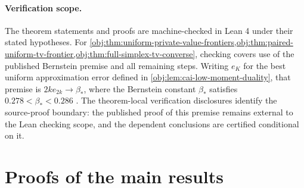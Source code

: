 \documentclass[11pt]{article}
\begin{document}
\paragraph{Verification scope.}
The theorem statements and proofs are machine-checked in Lean 4 under their stated hypotheses. For \cref{obj:thm:uniform-private-value-frontiers,obj:thm:paired-uniform-tv-frontier,obj:thm:full-simplex-tv-converse}, checking covers use of the published Bernstein premise and all remaining steps. Writing \(e_K\) for the best uniform approximation error defined in \cref{obj:lem:cai-low-moment-duality}, that premise is \(2k e_{2k}\to\beta_*\), where the Bernstein constant \(\beta_*\) satisfies \(0.278<\beta_*<0.286\) \citep[Section 3.1, definition of the Bernstein constant and immediately following paragraph, p.~8]{CaiLow2011Nonsmooth}. The theorem-local verification disclosures identify the source-proof boundary: the published proof of this premise remains external to the Lean checking scope, and the dependent conclusions are certified conditional on it.

\section{Proofs of the main results}\label{sec:deferred-proofs}
\end{document}
